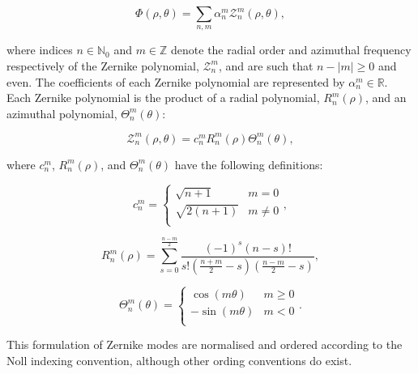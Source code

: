 \begin{equation}\label{eq:phase_zernike_expansion}
	\Phi\left(\rho,\theta\right) = \sum\limits_{n,m}\alpha^{m}_{n}\mathcal{Z}^{m}_{n}\left(\rho,\theta\right),
\end{equation}

where indices $n \in \mathbb{N}_{0}$ and $m \in \mathbb{Z}$ denote the radial order 
and azimuthal frequency respectively of the Zernike polynomial, 
$\mathcal{Z}^{m}_{n}$, and are such that $n - \left|m\right| \ge 0$ and even. The
coefficients of each Zernike polynomial are represented by $\alpha^{m}_{n} \in 
\mathbb{R}$. Each Zernike polynomial is the product of a radial polynomial,
$R^{m}_{n}(\rho)$, and an azimuthal polynomial, $\Theta^{m}_{n}(\theta)$:

\begin{equation}\label{eq:zernike_polynomial}
\mathcal{Z}^{m}_{n}\left(\rho,\theta\right) = c^{m}_{n}R^{m}_{n}(\rho)\Theta^{m}_{n}(\theta),
\end{equation}

where $c^{m}_{n}$, $R^{m}_{n}(\rho)$, and $\Theta^{m}_{n}(\theta)$ have the following definitions:

\begin{equation}\label{eq:zernike_polynomial_c}
c^{m}_{n} = 
\begin{cases}
\sqrt{n + 1} & m = 0\\
\sqrt{2(n + 1)} & m \ne 0\\
\end{cases},
\end{equation}

\begin{equation}\label{eq:zernike_polynomial_R}
R^{m}_{n}(\rho) = \sum_{s=0}^{\frac{n-m}{2}}{\frac{(-1)^{s}(n-s)!}{s!\left(\frac{n+m}{2}-s\right)\left(\frac{n-m}{2}-s\right)}},
\end{equation}

\begin{equation}\label{eq:zernike_polynomial_Theta}
\Theta^{m}_{n}(\theta) =
\begin{cases}
\cos(m\theta) & m \ge 0\\
-\sin(m\theta) & m < 0\\
\end{cases}.
\end{equation}

This formulation of Zernike modes are normalised and ordered according
to the Noll indexing convention, although other ording conventions do 
exist\cite{noll1976zernike,thibos2002standards,loomis1978computer}. 

